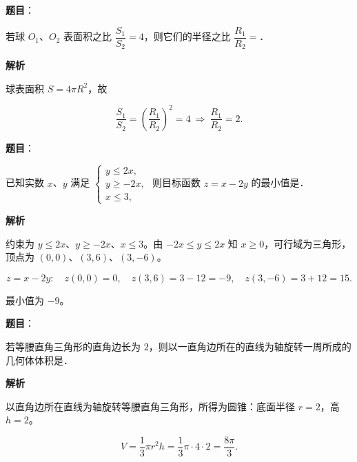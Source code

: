 \begin{answer}

\textbf{题目}：

若球 $O_1$、$O_2$ 表面积之比 $\dfrac{S_1}{S_2}=4$，则它们的半径之比 $\dfrac{R_1}{R_2}=$\gkblank{}．

\textbf{解析}

球表面积 $S=4\pi R^2$，故

\nopagebreak[4]
\[\frac{S_1}{S_2}=\left(\frac{R_1}{R_2}\right)^2=4\ \Longrightarrow\ \frac{R_1}{R_2}=2 .\]


\end{answer}
\begin{answer}

\textbf{题目}：

已知实数 $x$、$y$ 满足 $\begin{cases}y\leqslant2x,\\ y\geqslant-2x,\\ x\leqslant3,\end{cases}$ 则目标函数 $z=x-2y$ 的最小值是\gkblank{}．

\textbf{解析}

约束为 $y\leqslant2x$、$y\geqslant-2x$、$x\leqslant3$。由 $-2x\leqslant y\leqslant2x$ 知 $x\geqslant0$，可行域为三角形，顶点为 $(0,0)$、$(3,6)$、$(3,-6)$。

\nopagebreak[4]
\[z=x-2y:\quad z(0,0)=0,\quad z(3,6)=3-12=-9,\quad z(3,-6)=3+12=15 .\]

最小值为 $-9$。


\end{answer}
\begin{answer}

\textbf{题目}：

若等腰直角三角形的直角边长为 $2$，则以一直角边所在的直线为轴旋转一周所成的几何体体积是\gkblank{}．

\textbf{解析}

以直角边所在直线为轴旋转等腰直角三角形，所得为圆锥：底面半径 $r=2$，高 $h=2$。

\nopagebreak[4]
\[V=\frac13\pi r^2h=\frac13\pi\cdot4\cdot2=\frac{8\pi}{3}.\]


\end{answer}
